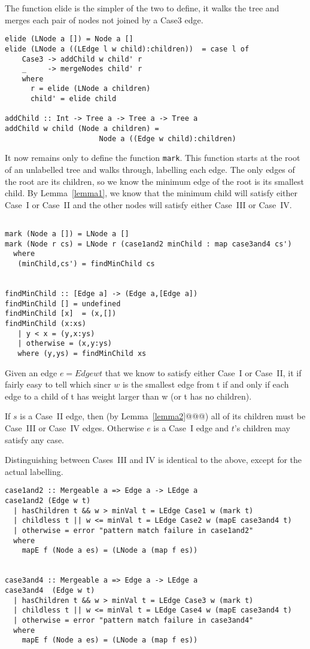 \documentclass{jfp}
\begin{document}
The function elide is the simpler of the two to define, it walks the
tree and merges each pair of nodes not joined by a Case3 edge.

\begin{verbatim}
elide (LNode a []) = Node a []
elide (LNode a ((LEdge l w child):children))  = case l of
    Case3 -> addChild w child' r
    _     -> mergeNodes child' r
    where
      r = elide (LNode a children)
      child' = elide child

addChild :: Int -> Tree a -> Tree a -> Tree a
addChild w child (Node a children) =
                      Node a ((Edge w child):children)

\end{verbatim}

It now remains only to define the function {\tt mark}. This function
starts at the root of an unlabelled tree and walks through, labelling
each edge. The only edges of the root are its children, so we know the
minimum edge of the root is its smallest child. By Lemma~\ref{lemma1}, we know
that the minimum child will satisfy either Case~I or Case~II and the
other nodes will satisfy either Case~III or Case~IV.

\begin{verbatim}

mark (Node a []) = LNode a []
mark (Node r cs) = LNode r (case1and2 minChild : map case3and4 cs')
  where
   (minChild,cs') = findMinChild cs


findMinChild :: [Edge a] -> (Edge a,[Edge a])
findMinChild [] = undefined
findMinChild [x]  = (x,[])
findMinChild (x:xs)
   | y < x = (y,x:ys)
   | otherwise = (x,y:ys)
   where (y,ys) = findMinChild xs
\end{verbatim}

Given an edge $e = Edge w t$ that we know to satisfy either Case~I or
Case~II, it if fairly easy to tell which sincr $w$ is the smallest
edge from t if and only if each edge to a child of t has weight larger
than w (or t has no children).

If $s$ is a Case~II edge, then (by Lemma~\ref{lemma2}@@@) all of its
children must be Case~III or Case~IV edges.  Otherwise $e$ is a Case~I
edge and $t$'s children may satisfy any case.

Distinguishing between Cases~III and IV is identical to the above,
except for the actual labelling.

\begin{verbatim}
case1and2 :: Mergeable a => Edge a -> LEdge a
case1and2 (Edge w t)
  | hasChildren t && w > minVal t = LEdge Case1 w (mark t)
  | childless t || w <= minVal t = LEdge Case2 w (mapE case3and4 t)
  | otherwise = error "pattern match failure in case1and2"
  where
    mapE f (Node a es) = (LNode a (map f es))


case3and4 :: Mergeable a => Edge a -> LEdge a
case3and4  (Edge w t)
  | hasChildren t && w > minVal t = LEdge Case3 w (mark t)
  | childless t || w <= minVal t = LEdge Case4 w (mapE case3and4 t)
  | otherwise = error "pattern match failure in case3and4"
  where
    mapE f (Node a es) = (LNode a (map f es))
\end{verbatim}
\end{document}
